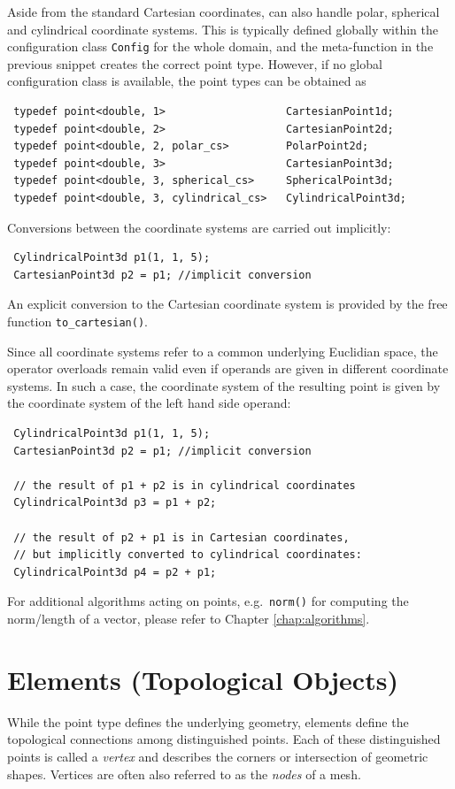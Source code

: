 Aside from the standard Cartesian coordinates, {\ViennaGrid} can also handle polar, spherical and cylindrical coordinate systems.
This is typically defined globally within the configuration class \lstinline|Config| for the whole domain, and the meta-function in the previous snippet creates the correct point type. However, if no global configuration class is available, the point types can be obtained as
\begin{lstlisting}
 typedef point<double, 1>                   CartesianPoint1d;
 typedef point<double, 2>                   CartesianPoint2d;
 typedef point<double, 2, polar_cs>         PolarPoint2d;
 typedef point<double, 3>                   CartesianPoint3d;
 typedef point<double, 3, spherical_cs>     SphericalPoint3d;
 typedef point<double, 3, cylindrical_cs>   CylindricalPoint3d;
\end{lstlisting}
Conversions between the coordinate systems are carried out implicitly:
\begin{lstlisting}
 CylindricalPoint3d p1(1, 1, 5);
 CartesianPoint3d p2 = p1; //implicit conversion
\end{lstlisting}
An explicit conversion to the Cartesian coordinate system is provided by the free function \lstinline|to_cartesian()|.

Since all coordinate systems refer to a common underlying Euclidian space, the operator overloads remain valid even if operands are given in different coordinate systems. In such a case, the coordinate system of the resulting point is given by the coordinate system of the left hand side operand:
\begin{lstlisting}
 CylindricalPoint3d p1(1, 1, 5);
 CartesianPoint3d p2 = p1; //implicit conversion

 // the result of p1 + p2 is in cylindrical coordinates
 CylindricalPoint3d p3 = p1 + p2;

 // the result of p2 + p1 is in Cartesian coordinates,
 // but implicitly converted to cylindrical coordinates:
 CylindricalPoint3d p4 = p2 + p1;
\end{lstlisting}
For additional algorithms acting on points, e.g.~\lstinline|norm()| for computing the norm/length of a vector, please refer to Chapter \ref{chap:algorithms}.



\section{Elements (Topological Objects)}
While the point type defines the underlying geometry, elements define the topological connections among distinguished points. Each of these distinguished points is called a \emph{vertex} and describes the corners or intersection of geometric shapes. Vertices are often also referred to as the \emph{nodes} of a mesh.

